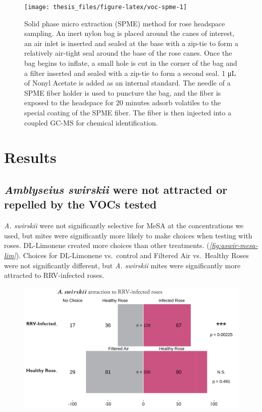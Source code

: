 \documentclass{ufdissertation}[overrideChapters] %
\begin{document}
{\begin{figure}
{\centering \texttt{[image: thesis\_files/figure-latex/voc-spme-1]} 

}

\caption[Solid phase micro extraction (SPME) method for rose headspace sampling]{Solid phase micro extraction (SPME) method for rose headspace sampling. An inert nylon bag is placed around the canes of interest, an air inlet is inserted and sealed at the base with a zip-tie to form a relatively air-tight seal around the base of the rose canes. Once the bag begins to inflate, a small hole is cut in the corner of the bag and a filter inserted and sealed with a zip-tie to form a second seal. 1 \si{\micro\liter} of Nonyl Acetate is added as an internal standard. The needle of a SPME fiber holder is used to puncture the bag, and the fiber is exposed to the headspace for 20 minutes adsorb volatiles to the special coating of the SPME fiber. The fiber is then injected into a coupled GC-MS for chemical identification.}\label{fig:voc-spme}
\end{figure}
\hypertarget{results-1}{%
\section{Results}\label{results-1}}

\hypertarget{amblyseius-swirskii-were-not-attracted-or-repelled-by-the-vocs-tested}{%
\subsection{\texorpdfstring{\emph{Amblyseius swirskii} were not attracted or repelled by the VOCs tested}{Amblyseius swirskii were not attracted or repelled by the VOCs tested}}\label{amblyseius-swirskii-were-not-attracted-or-repelled-by-the-vocs-tested}}

\emph{A. swirskii} were not significantly selective for MeSA at the concentrations we used, but mites were significantly more likely to make choices when testing with roses. DL-Limonene created more choices than other treatments. (\emph{\ref{fig:aswir-mesa-lim}}). Choices for DL-Limonene vs.~control and Filtered Air vs.~Healthy Roses were not significantly different, but \emph{A. swirskii} mites were significantly more attracted to RRV-infected roses.
\begin{figure}

{\centering \includegraphics[width=1\linewidth]{figure/rrv_graph_olfact_rose} 

}
\end{figure}}
\end{document}

